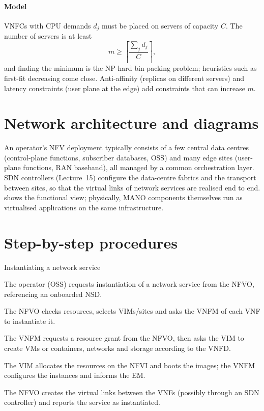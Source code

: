 \documentclass[11pt,a4paper]{article}
\begin{document}
\paragraph{Model} VNFCs with CPU demands $d_j$ must be placed on servers of capacity $C$. The number of servers is at
least
\begin{equation}\label{eq:binpack}
  m \ge \left\lceil \frac{\sum_j d_j}{C} \right\rceil ,
\end{equation}
and finding the minimum is the NP-hard bin-packing problem; heuristics such as first-fit decreasing come close.
Anti-affinity (replicas on different servers) and latency constraints (user plane at the edge) add constraints that
can increase $m$.

\section{Network architecture and diagrams}
An operator's NFV deployment typically consists of a few central data centres (control-plane functions,
subscriber databases, OSS) and many edge sites (user-plane functions, RAN baseband), all managed by a common
orchestration layer. SDN controllers (Lecture~15) configure the data-centre fabrics and the transport between sites,
so that the virtual links of network services are realised end to end.  shows the functional
view; physically, MANO components themselves run as virtualised applications on the same infrastructure.

\section{Step-by-step procedures}

\begin{procedurebox}{Instantiating a network service}\label{proc:inst}
\begin{steps}
  \item The operator (OSS) requests instantiation of a network service from the NFVO, referencing an onboarded NSD.
  \item The NFVO checks resources, selects VIMs/sites and asks the VNFM of each VNF to instantiate it.
  \item The VNFM requests a resource grant from the NFVO, then asks the VIM to create VMs or containers, networks and
        storage according to the VNFD.
  \item The VIM allocates the resources on the NFVI and boots the images; the VNFM configures the instances and
        informs the EM.
  \item The NFVO creates the virtual links between the VNFs (possibly through an SDN controller) and reports the
        service as instantiated.
\end{steps}
\end{procedurebox}
\end{document}
